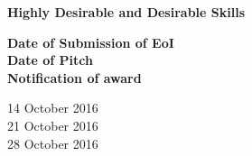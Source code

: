 \documentclass[11pt, oneside]{article}
\begin{document}
\textbf{Highly Desirable and Desirable Skills}\\
\begin{minipage}[t]{0.5\textwidth}
    \textbf{Date of Submission of EoI}\\
    \textbf{Date of Pitch}\\
    \textbf{Notification of award}\\
    
\end{minipage}
\begin{minipage}[t]{0.5\textwidth}
    14 October 2016\\
    21 October 2016\\
    28 October 2016\\
\end{minipage}
\end{document}
